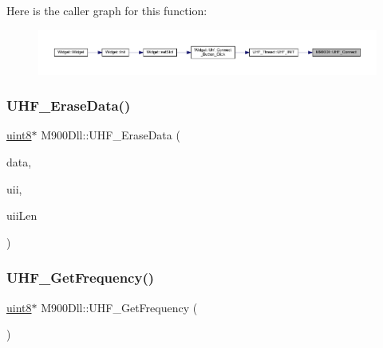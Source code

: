 Here is the caller graph for this function\+:
\nopagebreak
\begin{figure}[H]
\begin{center}
\leavevmode
\includegraphics[width=350pt]{class_m900_dll_a1dc3932fe303c73e955cb116b404e197_icgraph}
\end{center}
\end{figure}
\mbox{\label{class_m900_dll_a1d1ee05b96db7792ac5a7ddfc89d2ba1}} 
\subsubsection{\texorpdfstring{UHF\_EraseData()}{UHF\_EraseData()}}
{\footnotesize\ttfamily \mbox{\hyperlink{m900dll_8h_adde6aaee8457bee49c2a92621fe22b79}{uint8}}$\ast$ M900\+Dll\+::\+U\+H\+F\+\_\+\+Erase\+Data (\begin{DoxyParamCaption}\item[{\mbox{\hyperlink{struct_u_h_f___req_erase_data__t}{U\+H\+F\+\_\+\+Req\+Erase\+Data\+\_\+t}} $\ast$}]{data,  }\item[{\mbox{\hyperlink{m900dll_8h_adde6aaee8457bee49c2a92621fe22b79}{uint8}} $\ast$}]{uii,  }\item[{\mbox{\hyperlink{m900dll_8h_adde6aaee8457bee49c2a92621fe22b79}{uint8}}}]{uii\+Len }\end{DoxyParamCaption})}

\mbox{\label{class_m900_dll_aa436421b44f8bd5f956f39dc180b7fe2}} 
\subsubsection{\texorpdfstring{UHF\_GetFrequency()}{UHF\_GetFrequency()}}
{\footnotesize\ttfamily \mbox{\hyperlink{m900dll_8h_adde6aaee8457bee49c2a92621fe22b79}{uint8}}$\ast$ M900\+Dll\+::\+U\+H\+F\+\_\+\+Get\+Frequency (\begin{DoxyParamCaption}\item[{void}]{ }\end{DoxyParamCaption})}

